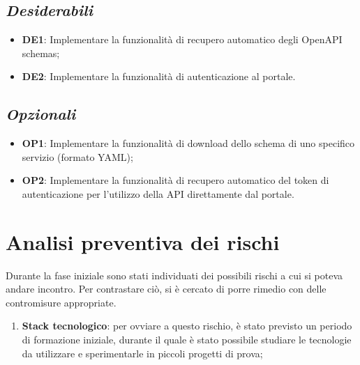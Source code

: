\subsection*{\emph{Desiderabili}}
\begin{itemize}
    \item \textbf{DE1}:  Implementare la funzionalità di recupero automatico degli OpenAPI schemas;
    \item \textbf{DE2}: Implementare la funzionalità di autenticazione al portale.
\end{itemize}

\subsection*{\emph{Opzionali}}
\begin{itemize}
    \item \textbf{OP1}: Implementare la funzionalità di download dello schema di uno specifico servizio (formato YAML);
    \item \textbf{OP2}: Implementare la funzionalità di recupero automatico del token di autenticazione per l'utilizzo della API direttamente dal portale.
\end{itemize}

\section{Analisi preventiva dei rischi}
Durante la fase iniziale sono stati individuati dei possibili rischi a cui si poteva andare incontro. Per contrastare ciò, si è cercato di porre rimedio con delle contromisure appropriate.
\begin{enumerate}
    \item \textbf{Stack tecnologico}: per ovviare a questo rischio, è stato previsto un periodo di formazione iniziale, durante il quale è stato possibile studiare le tecnologie da utilizzare e sperimentarle in piccoli progetti di prova;
\end{enumerate}








